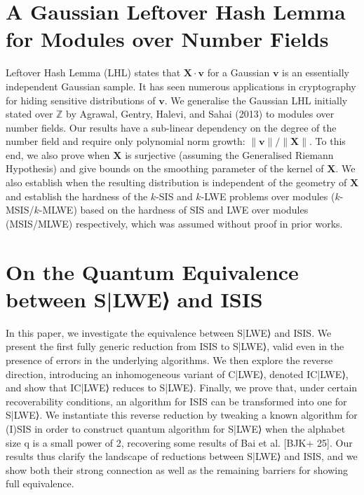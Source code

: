 \documentclass[11pt,oneside]{book}
\theoremstyle{definition}
\theoremstyle{remark}
\theoremstyle{plain}
\begin{document}
\section{\cite{cryptoeprint:2025/1852} A Gaussian Leftover Hash Lemma for Modules over Number Fields}
Leftover Hash Lemma (LHL) states that \(\mathbf{X} \cdot \mathbf{v}\) for a Gaussian \(\mathbf{v}\) is an essentially independent Gaussian sample. It has seen numerous applications in cryptography for hiding sensitive distributions of \(\mathbf{v}\). We generalise the Gaussian LHL initially stated over \(\mathbb{Z}\) by Agrawal, Gentry, Halevi, and Sahai (2013) to modules over number fields. Our results have a sub-linear dependency on the degree of the number field and require only polynomial norm growth: \(\lVert\mathbf{v}\rVert/\lVert\mathbf{X}\rVert\). To this end, we also prove when \(\mathbf{X}\) is surjective (assuming the Generalised Riemann Hypothesis) and give bounds on the smoothing parameter of the kernel of \(\mathbf{X}\). We also establish when the resulting distribution is independent of the geometry of \(\mathbf{X}\) and establish the hardness of the \(k\)-SIS and \(k\)-LWE problems over modules (\(k\)-MSIS/\(k\)-MLWE) based on the hardness of SIS and LWE over modules (MSIS/MLWE) respectively, which was assumed without proof in prior works.

\section{\cite{cryptoeprint:2025/1857} On the Quantum Equivalence between \mbox{S|LWE⟩} and ISIS}

In this paper, we investigate the equivalence between S|LWE⟩ and ISIS. We present the first fully generic reduction from ISIS to S|LWE⟩, valid even in the presence of errors in the underlying algorithms. We then explore the reverse direction, introducing an inhomogeneous variant of C|LWE⟩, denoted IC|LWE⟩, and show that IC|LWE⟩ reduces to S|LWE⟩. Finally, we prove that, under certain recoverability conditions, an algorithm for ISIS can be transformed into one for S|LWE⟩. We instantiate this reverse reduction by tweaking a known algorithm for (I)SIS in order to construct quantum algorithm for S|LWE⟩ when the alphabet size q is a small power of 2, recovering some results of Bai et al. [BJK+ 25]. Our results thus clarify the landscape of reductions between S|LWE⟩ and ISIS, and we show both their strong connection as well as the remaining barriers for showing full equivalence.
\end{document}
